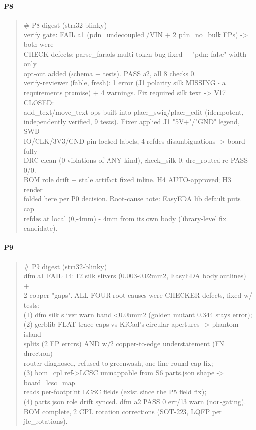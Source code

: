\documentclass[11pt,a4paper]{article}
\begin{document}
\paragraph*{P8}
\begin{quote}\small\ttfamily\raggedright
\# P8 digest (stm32-blinky)\\
verify gate: FAIL a1 (pdn\_undecoupled /VIN + 2 pdn\_no\_bulk FPs) -\textgreater{} both were\\
CHECK defects: parse\_farads multi-token bug fixed + "pdn: false" width-only\\
opt-out added (schema + tests). PASS a2, all 8 checks 0.\\
verify-reviewer (fable, fresh): 1 error (J1 polarity silk MISSING - a\\
requirements promise) + 4 warnings. Fix required silk text -\textgreater{} V17 CLOSED:\\
add\_text/move\_text ops built into place\_swig/place\_edit (idempotent,\\
independently verified, 9 tests). Fixer applied J1 "5V+"/"GND" legend, SWD\\
IO/CLK/3V3/GND pin-locked labels, 4 refdes disambiguations -\textgreater{} board fully\\
DRC-clean (0 violations of ANY kind), check\_silk 0, drc\_routed re-PASS 0/0.\\
BOM role drift + stale artifact fixed inline. H4 AUTO-approved; H3 render\\
folded here per P0 decision. Root-cause note: EasyEDA lib default puts cap\\
refdes at local (0,-4mm) - 4mm from its own body (library-level fix candidate).
\end{quote}
\paragraph*{P9}
\begin{quote}\small\ttfamily\raggedright
\# P9 digest (stm32-blinky)\\
dfm a1 FAIL 14: 12 silk slivers (0.003-0.02mm2, EasyEDA body outlines) +\\
2 copper "gaps". ALL FOUR root causes were CHECKER defects, fixed w/ tests:\\
(1) dfm silk sliver warn band \textless{}0.05mm2 (golden mutant 0.344 stays error);\\
(2) gerblib FLAT trace caps vs KiCad's circular apertures -\textgreater{} phantom island\\
splits (2 FP errors) AND w/2 copper-to-edge understatement (FN direction) -\\
router diagnosed, refused to greenwash, one-line round-cap fix;\\
(3) bom\_cpl ref-\textgreater{}LCSC unmappable from S6 parts.json shape -\textgreater{} board\_lcsc\_map\\
reads per-footprint LCSC fields (exist since the P5 field fix);\\
(4) parts.json role drift synced. dfm a2 PASS 0 err/13 warn (non-gating).\\
BOM complete, 2 CPL rotation corrections (SOT-223, LQFP per jlc\_rotations).
\end{quote}
\end{document}
